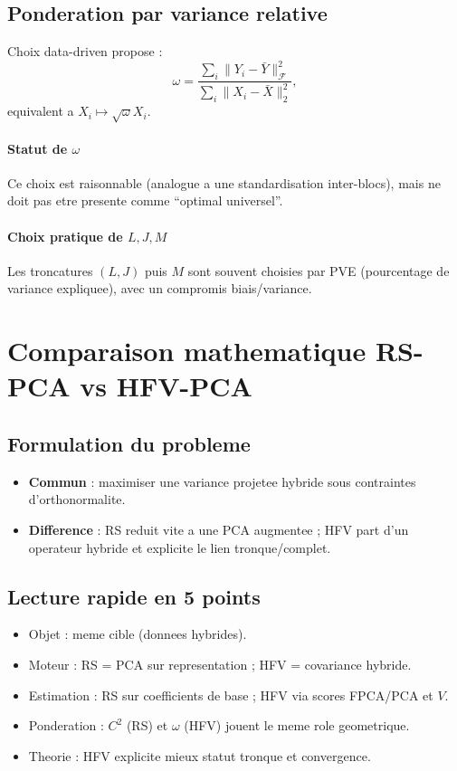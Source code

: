 \documentclass[11pt,a4paper]{article}
\begin{document}
\subsection{Ponderation par variance relative}

Choix data-driven propose :
\begin{equation}
\omega=
\frac{\sum_i\|Y_i-\bar{Y}\|_{\mathcal{F}}^2}{\sum_i\|X_i-\bar{X}\|_2^2},
\label{eq:hfv-omega}
\end{equation}
equivalent a $X_i\mapsto \sqrt{\omega}X_i$.

\paragraph{Statut de $\omega$}
Ce choix est raisonnable (analogue a une standardisation inter-blocs), mais ne
doit pas etre presente comme ``optimal universel''.

\paragraph{Choix pratique de $L,J,M$}
Les troncatures $(L,J)$ puis $M$ sont souvent choisies par PVE (pourcentage de
variance expliquee), avec un compromis biais/variance.

\section{Comparaison mathematique RS-PCA vs HFV-PCA}
\label{sec:comp}

\subsection{Formulation du probleme}
\begin{itemize}[leftmargin=1.5em]
  \item \textbf{Commun} : maximiser une variance projetee hybride sous
  contraintes d'orthonormalite.
  \item \textbf{Difference} : RS reduit vite a une PCA augmentee ; HFV part d'un
  operateur hybride et explicite le lien tronque/complet.
\end{itemize}

\subsection{Lecture rapide en 5 points}
\begin{itemize}[leftmargin=1.5em]
  \item Objet : meme cible (donnees hybrides).
  \item Moteur : RS = PCA sur representation ; HFV = covariance hybride.
  \item Estimation : RS sur coefficients de base ; HFV via scores FPCA/PCA et $V$.
  \item Ponderation : $C^2$ (RS) et $\omega$ (HFV) jouent le meme role geometrique.
  \item Theorie : HFV explicite mieux statut tronque et convergence.
\end{itemize}
\end{document}
